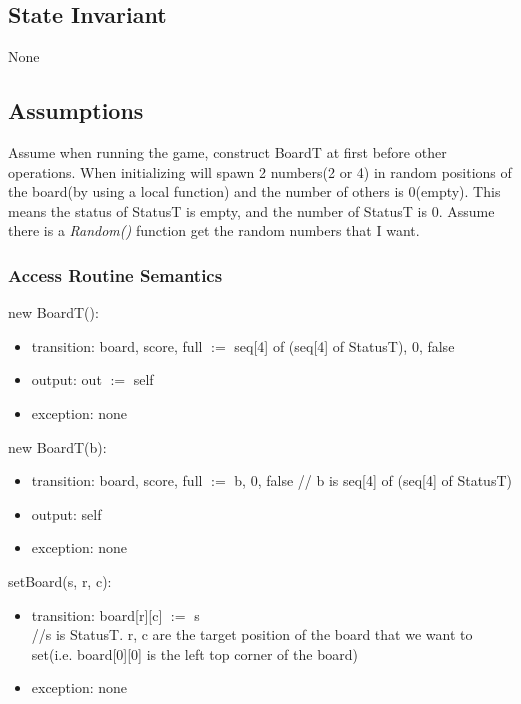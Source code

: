 \documentclass[12pt]{article}
\begin{document}
\subsection*{State Invariant}

None

\subsection*{Assumptions}

Assume when running the game, construct BoardT at first before other operations.
\newline
When initializing will spawn 2 numbers(2 or 4) in random positions of the board(by using a local function) and the number of others is 0(empty).
This means the status of StatusT is empty, and the number of StatusT is 0.
\newline
Assume there is a \textit{Random()} function get the random numbers that I want.

\subsubsection* {Access Routine Semantics}

new BoardT():

\begin{itemize}
  \item transition: board, score, full $:=$ seq[4] of (seq[4] of StatusT), 0, false
  \item output: out $:=$ self
  \item exception: none
\end{itemize}

\noindent new BoardT(b):

\begin{itemize}
  \item transition: board, score, full $:=$ b, 0, false \quad // b is seq[4] of (seq[4] of StatusT)
  \item output: self
  \item exception: none
\end{itemize}

\noindent setBoard(s, r, c):
\begin{itemize}
  \item transition: board[r][c] $:=$ s \\
   \quad //s is StatusT. r, c are the target position of the board that we want to set(i.e. board[0][0] is the left top corner of the board)
  \item exception: none
\end{itemize}
\end{document}

